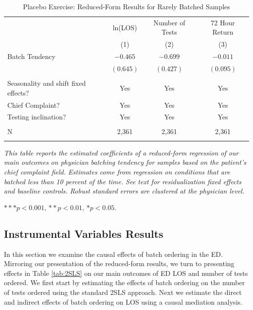 \documentclass[,,nonblindrev]{informs}
\begin{document}
\begin{table}[htbp]
\centering
\caption{Placebo Exercise: Reduced-Form Results for Rarely Batched Samples}
\label{tab:placebo_check}
\begin{tabular}{p{8cm}ccc}
\toprule
& ln(LOS) & Number of Tests & 72 Hour Return \\ 
& (1) & (2) & (3) \\
\midrule
Batch Tendency & $-0.465$ & $-0.699$ & $-0.011$ \\
& $(0.645)$ & $(0.427)$ & $(0.095)$ \\
                    &     &     &  \\
Seasonality and shift fixed effects? & Yes & Yes & Yes \\
Chief Complaint? & Yes & Yes & Yes \\
Testing inclination? & Yes & Yes & Yes \\
                    &     &     &  \\
N & 2,361 & 2,361 & 2,361 \\
\addlinespace
\midrule
\bottomrule
\end{tabular}
\begin{tablenotes}
\small
\item \textit{This table reports the estimated coefficients of a reduced-form regression of our main outcomes on physician batching tendency for samples based on the patient’s chief complaint field. Estimates come from regression on conditions that are batched less than 10 percent of the time. See text for residualization fixed effects and baseline controls. Robust standard errors are clustered at the physician level.}
\item $*** p < 0.001$, $** p < 0.01$, $* p < 0.05$.
\end{tablenotes}
\end{table}

\hypertarget{instrumental-variables-results}{%
\subsection{Instrumental Variables
Results}\label{instrumental-variables-results}}

In this section we examine the causal effects of batch ordering in the
ED. Mirroring our presentation of the reduced-form results, we turn to
presenting effects in Table \ref{tab:2SLS} on our main outcomes of ED
LOS and number of tests ordered. We first start by estimating the
effects of batch ordering on the number of tests ordered using the
standard 2SLS approach. Next we estimate the direct and indirect effects
of batch ordering on LOS using a causal mediation analysis.
\end{document}

